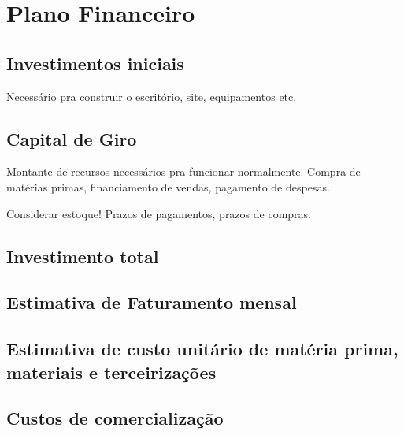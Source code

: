 \section{Plano Financeiro}



\subsection{Investimentos iniciais}

Necessário pra construir o escritório, site, equipamentos etc.

\subsection{Capital de Giro}

Montante de recursos necessários pra funcionar normalmente. Compra de matérias primas,
financiamento de vendas, pagamento de despesas.

Considerar estoque!
Prazos de pagamentos, prazos de compras.

\subsection{Investimento total}

\subsection{Estimativa de Faturamento mensal}

\subsection{Estimativa de custo unitário de matéria prima, materiais e terceirizações}

\subsection{Custos de comercialização}